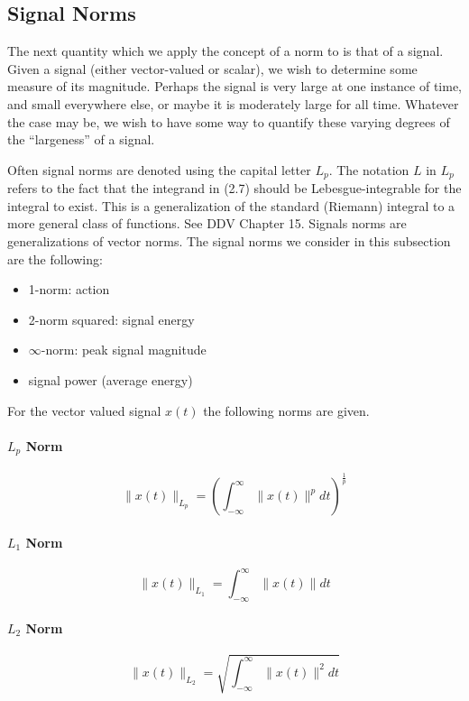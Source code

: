 \subsection{Signal Norms}

The next quantity which we apply the concept of a norm to is that of a signal.
Given a signal (either vector-valued or scalar), we wish to determine some measure of its magnitude.
Perhaps the signal is very large at one instance of time, and small everywhere else, or maybe it is moderately large for all time.
Whatever the case may be, we wish to have some way to quantify these varying degrees of the ``largeness'' of a signal.

Often signal norms are denoted using the capital letter $L_{p}$.
The notation $L$ in $L_{p}$ refers to the fact that the integrand in (2.7) should be Lebesgue-integrable for the integral to exist.
This is a generalization of the standard (Riemann) integral to a more general class of functions.
See DDV Chapter 15.
Signals norms are generalizations of vector norms.
The signal norms we consider in this subsection are the following:

\begin{itemize}
  \item{1-norm: action}
  \item{2-norm squared: signal energy}
  \item{$\infty$-norm: peak signal magnitude}
  \item{signal power (average energy)}
\end{itemize}
For the vector valued signal $x(t)$ the following norms are given.
\paragraph{$L_{p}$ Norm}
\begin{equation*}
  \|x(t)\|_{L_{p}}=\left(\int_{-\infty}^{\infty}\|x(t)\|^{p}dt\right)^{\frac{1}{p}}
\end{equation*}

\paragraph{$L_{1}$ Norm}
\begin{equation*}
  \|x(t)\|_{L_{1}}=\int_{-\infty}^{\infty}\|x(t)\|dt
\end{equation*}

\paragraph{$L_{2}$ Norm}
\begin{equation*}
  \|x(t)\|_{L_{2}}=\sqrt{\int_{-\infty}^{\infty}\|x(t)\|^{2}dt}
\end{equation*}

